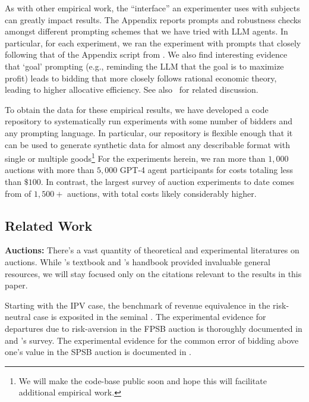 \documentclass{article} %
\begin{document}
As with other empirical work, the ``interface'' an experimenter uses with subjects can greatly impact results. 
The Appendix reports prompts and robustness checks amongst different prompting schemes that we have tried with LLM agents. 
In particular, for each experiment, we ran the experiment with prompts that closely following that of the Appendix script from \cite{li2017obviously}.
 We also find interesting evidence that `goal' prompting (e.g., reminding the LLM that the goal is to maximize profit) leads to bidding that more closely follows rational economic theory, leading to higher allocative efficiency. 
 See also~\cite{manning2024automated} for related discussion. 

To obtain the data for these empirical results, we have developed a code repository to systematically run experiments 
with some number of bidders
and any prompting language. 
In particular, our repository is flexible enough that it can be used to generate synthetic data for almost any describable format with single or multiple goods\footnote{We will make the code-base public soon and hope this will facilitate additional empirical work.}
%
For the experiments herein, we ran more than $1,000$ auctions with more than $5,000$ GPT-4 agent participants for costs totaling less than $\$100$. 
In contrast, the largest survey of auction experiments to date comes from \citet{cox1986controlled} of $1,500+$ auctions, with total costs likely considerably higher.

\subsection{Related Work}




\textbf{Auctions:}
There's a vast quantity of theoretical and experimental literatures on auctions. 
While \cite{krishna2009auction}'s textbook and \citet{kagel2020handbook}'s handbook provided invaluable general resources, we will stay focused only on the citations relevant to the results in this paper.

Starting with the IPV case, the benchmark of revenue equivalence in the risk-neutral case is exposited in the seminal 
\citet{myerson1981optimal}. 
The experimental evidence for departures due to risk-aversion in the FPSB auction is thoroughly documented in \citet{coppinger1980incentives} and \citet{cox1986controlled}'s survey. 
The experimental evidence for the common error of bidding above one's value in the SPSB auction is documented in \citet{kagel1993independent}.
\end{document}
